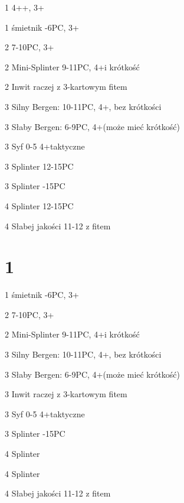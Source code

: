 \documentclass[12pt, a4paper]{article}
\begin{document}
\sequence{{1\hearts}}
\begin{options}[2]
    \item[1\spades] 4+\spades {}+\spades, 3+\hearts  \gf
    \item[1\nt] \nf śmietnik -6PC, 3+\hearts
    \item[2\hearts] 7-10PC, 3+\hearts
    \item[2\spades] Mini-Splinter 9-11PC, 4+\hearts i krótkość \br
    \item[2\nt] Inwit raczej z 3-kartowym fitem  
    \item[3\clubs] Silny Bergen: 10-11PC, 4+\hearts, bez krótkości
    \item[3\diams] Słaby Bergen: 6-9PC, 4+\hearts (może mieć krótkość) \br
    \item[3\hearts] Syf 0-5 4+\hearts taktyczne
    \item[3\spades] Splinter 12-15PC
    \item[3\nt] Splinter -15PC   
    \item[4\clubs] Splinter 12-15PC
    \item[4\diams] Słabej jakości 11-12 z fitem  
\end{options}

\section*{1\spades}
\sequence{{1\spades}}
\begin{options}[2]
    \item[1\nt] \nf śmietnik -6PC, 3+\spades
    \item[2\spades] 7-10PC, 3+\spades
    \item[2\nt] Mini-Splinter 9-11PC, 4+\spades i krótkość \br
    \item[3\clubs] Silny Bergen: 10-11PC, 4+\hearts, bez krótkości
    \item[3\diams] Słaby Bergen: 6-9PC, 4+\hearts (może mieć krótkość)
    \item[3\hearts] Inwit raczej z 3-kartowym fitem \spades \br
    \item[3\spades] Syf 0-5 4+\spades taktyczne
    \item[3\nt] Splinter -15PC  
    \item[4\clubs] Splinter
    \item[4\diams] Splinter
    \item[4\hearts] Słabej jakości 11-12 z fitem    
\end{options}
\end{document}
